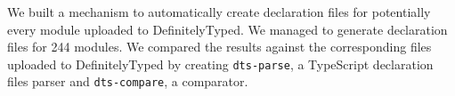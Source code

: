 \documentclass[english,cleveref,autoref,submission]{programming}
\newenvironment{changethis}{%
  \begin{tcolorbox}[breakable,notitle,boxrule=0pt,colback=blue!20,colframe=blue!20]}{%
  \end{tcolorbox}}
\begin{document}
We built a mechanism to automatically create declaration files for potentially every
module uploaded to DefinitelyTyped. We managed to generate declaration files for 244
modules. We compared the results against the corresponding files uploaded to
DefinitelyTyped by creating \texttt{dts-parse}, a TypeScript declaration files parser and
\texttt{dts-compare}, a comparator.



\printbibliography
\end{document}
